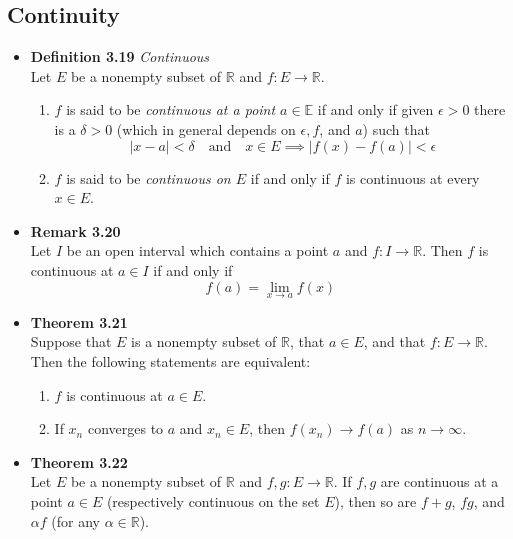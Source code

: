 \documentclass[11pt,a4paper]{article}
\begin{document}
\subsection{Continuity}

\begin{itemize}
    \item \textbf{Definition 3.19} \emph{Continuous} \\
        Let $E$ be a nonempty subset of $\mathbb{R}$ and $f : E \to \mathbb{R}$.
        \begin{enumerate}
            \item $f$ is said to be \emph{continuous at a point $a \in \mathbb{E}$} if and only
                if given $\epsilon > 0$ there is a $\delta > 0$
                (which in general depends on $\epsilon, f$, and $a$) such that
                \[
                    |x-a| < \delta \quad \text{and} \quad x \in E \implies
                    |f(x) - f(a)| < \epsilon
                \]
            \item $f$ is said to be \emph{continuous on $E$} if and only if $f$ is continuous
                at every $x \in E$.
        \end{enumerate}
    \item \textbf{Remark 3.20} \\
        Let $I$ be an open interval which contains a point $a$ and $f : I \to \mathbb{R}$.
        Then $f$ is continuous at $a \in I$ if and only if
        \[
            f(a) = \lim_{x \to a} f(x)
        \]
    \item \textbf{Theorem 3.21} \\
        Suppose that $E$ is a nonempty subset of $\mathbb{R}$, that $a \in E$, and that
        $f : E \to \mathbb{R}$.
        Then the following statements are equivalent:
        \begin{enumerate}
            \item $f$ is continuous at $a \in E$.
            \item If $x_n$ converges to $a$ and $x_n \in E$, then
                $f(x_n) \to f(a)$ as $n \to \infty$.
        \end{enumerate}
    \item \textbf{Theorem 3.22} \\
        Let $E$ be a nonempty subset of $\mathbb{R}$ and $f, g : E \to \mathbb{R}$.
        If $f, g$ are continuous at a point $a \in E$ (respectively continuous on the set $E$),
        then so are $f+g$, $fg$, and $\alpha f$ (for any $\alpha \in \mathbb{R}$).

\end{itemize}
\end{document}
